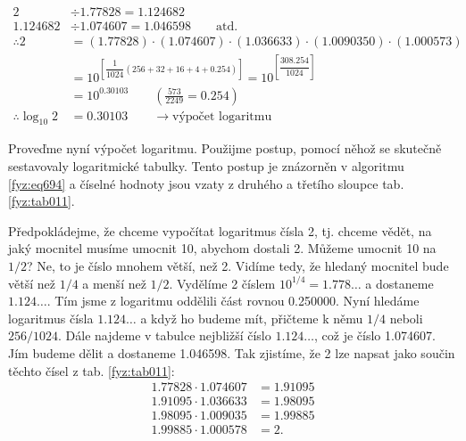     \begin{strip}
      \begin{align}\label{fyz:eq694}
                     2&÷\num{1.77828} =\num{1.124682}                                    \nonumber\\
        \num{1.124682}&÷\num{1.074607}=\num{1.046598}                 \qquad\text{atd.}  \nonumber\\
                  ∴  2&=(\num{1.77828})\cdot(\num{1.074607})\cdot
                       (\num{1.036633})\cdot(\num{1.0090350})\cdot(\num{1.000573})       \nonumber\\
                      &=10^{\left[\dfrac{1}{1024}(256+32+16+4+\num{0.254})\right]}
                       =10^{\left[\dfrac{308.254}{1024}\right]}                          \nonumber\\
                      &=10^{\num{0.30103}}\qquad\left(\frac{573}{2249}=\num{0.254}\right)\nonumber\\
          ∴ \log_{10}2&=\num{0.30103}    \qquad\rightarrow\text{výpočet logaritmu}                                       
      \end{align}
    \end{strip}

    Proveďme nyní výpočet logaritmu. Použijme postup, pomocí něhož se skutečně sestavovaly
    logaritmické tabulky. Tento postup je znázorněn v algoritmu \ref{fyz:eq694} a číselné hodnoty
    jsou vzaty z druhého a třetího sloupce tab. \ref{fyz:tab011}.

    Předpokládejme, že chceme vypočítat logaritmus čísla \num{2}, tj. chceme vědět, na jaký mocnitel
    musíme umocnit \num{10}, abychom dostali \num{2}. Můžeme umocnit \num{10} na \(1/2\)? Ne, to je
    číslo mnohem větší, než \num{2}. Vidíme tedy, že hledaný mocnitel bude větší než \(1/4\) a menší
    než \(1/2\). Vydělíme \num{2} číslem \(10^{1/4} = \num{1.778}\ldots\) a dostaneme
    \(\num{1.124}\ldots\). Tím jsme z logaritmu oddělili část rovnou \num{0.250000}. Nyní hledáme
    logaritmus čísla \(\num{1.124}\ldots\) a když ho budeme mít, přičteme k němu \(1/4\) neboli
    \(256/1024\). Dále najdeme v tabulce nejbližší číslo \(\num{1.124}\ldots\), což je číslo
    \num{1.074607}. Jím budeme dělit a dostaneme \num{1.046598}. Tak zjistíme, že \num{2} lze napsat
    jako součin těchto čísel z tab. \ref{fyz:tab011}:
    \begin{align*}
      \num{1.77828}\cdot\num{1.074607} &= \num{1.91095}                                        \\
      \num{1.91095}\cdot\num{1.036633} &= \num{1.98095}                                        \\
      \num{1.98095}\cdot\num{1.009035} &= \num{1.99885}                                        \\
      \num{1.99885}\cdot\num{1.000578} &= \num{2}.
    \end{align*}

